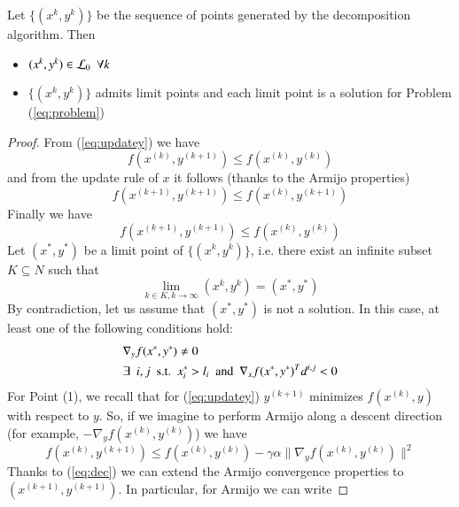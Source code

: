 \begin{proposition}
Let $\{(x^k, y^k)\}$ be the sequence of points generated by the decomposition algorithm. Then
\begin{itemize}
\item $(x^k, y^k) \in \mathcal{L}_0 \enskip \forall k$ 
\item  $\{(x^k, y^k)\}$ admits limit points and each limit point is a solution for Problem (\ref{eq:problem})
\end{itemize}
\end{proposition}
\begin{proof}
From (\ref{eq:updatey}) we have
\begin{equation}
f(x^{(k)}, y^{(k+1)}) \leq f(x^{(k)}, y^{(k)})
\end{equation}
and from the update rule of $x$ it follows (thanks to the Armijo properties)
\begin{equation}\label{eq:dec}
f(x^{(k+1)}, y^{(k+1)}) \leq f(x^{(k)}, y^{(k+1)})
\end{equation}
Finally we have
\begin{equation}
f(x^{(k+1)}, y^{(k+1)}) \leq f(x^{(k)}, y^{(k)})
\end{equation}
Let $(x^*,y^*)$ be a limit point of $\{(x^k, y^k)\}$, i.e. there exist an infinite subset $K \subseteq N$ such that
\begin{equation}
\lim_{k \in K, k \rightarrow \infty} (x^k, y^k) = (x^*,y^*)
\end{equation}
By contradiction, let us assume that $(x^*,y^*)$ is not a solution. In this case, at least one of the following conditions hold:
\begin{subequations}
\begin{align}
&\nabla_y f(x^*,y^*) \neq 0 \\
&\exists \enskip i, j \enskip  \text{s.t.} \enskip x^*_i > l_i \enskip  \text{and} \enskip  \nabla_x f(x^*,y^*)^T d^{i,j} < 0
\end{align}
\end{subequations}
For Point (1), we recall that for (\ref{eq:updatey}) $y^{(k+1)}$ minimizes $f(x^{(k)},y)$ with respect to $y$. So, if we imagine to perform Armijo along a descent direction (for example, $-\nabla_y f(x^{(k)},y^{(k)})$) we have
\begin{equation}
f(x^{(k)}, y^{(k+1)}) \leq f(x^{(k)}, y^{(k)}) - \gamma \alpha \parallel \nabla_y f(x^{(k)}, y^{(k)}) \parallel ^2
\end{equation}
Thanks to (\ref{eq:dec}) we can extend the Armijo convergence properties to $(x^{(k+1)}, y^{(k+1)})$. In particular, for Armijo we can write

\end{proof}
